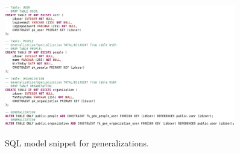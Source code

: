 \begin{figure}[!htb]
    \centering
    \caption{SQL model snippet for generalizations.}
    \includegraphics[width=0.9\textwidth]{img/SQL_Generalization.png}
    \label{fig:SQL_Generalization}
\end{figure}

